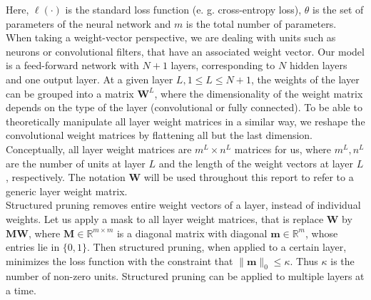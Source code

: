 Here, $\ell(\cdot)$ is the standard loss function (e. g. cross-entropy loss), $\theta$ is the set of parameters of the neural network and $m$ is the total number of parameters. \\

When taking a weight-vector perspective, we are dealing with units such as neurons or convolutional filters, that have an associated weight vector. Our model is a feed-forward network with $N+1$ layers, corresponding to $N$ hidden layers and one output layer. At a given layer $L, 1 \leq L \leq N+1$, the weights of the layer can be grouped into a matrix $\mathbf{W}^L$, where the dimensionality of the weight matrix depends on the type of the layer (convolutional or fully connected). To be able to theoretically manipulate all layer weight matrices in a similar way, we reshape the convolutional weight matrices by flattening all but the last dimension. Conceptually, all layer weight matrices are $m^L \times n^L$ matrices for us, where $m^L, n^L$ are the number of units at layer $L$ and the length of the weight vectors at layer $L$, respectively. The notation $\mathbf{W}$ will be used throughout this report to refer to a generic layer weight matrix. \\

Structured pruning removes entire weight vectors of a layer, instead of individual weights. Let us apply a mask to all layer weight matrices, that is replace $\mathbf{W}$ by $\mathbf{M}\mathbf{W}$, where $\mathbf{M} \in \mathbb{R}^{m \times m}$ is a diagonal matrix with diagonal $\mathbf{m} \in \mathbb{R}^m$, whose entries lie in $\{0,1\}$. Then structured pruning, when applied to a certain layer, minimizes the loss function with the constraint that $\|\textbf{m}\|_0 \leq \kappa$. Thus $\kappa$ is the number of non-zero units. Structured pruning can be applied to multiple layers at a time.


